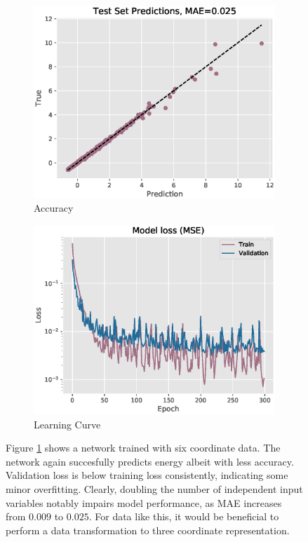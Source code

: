 \documentclass[12pt,a4paper]{article}
\begin{document}
\begin{figure}[h!]
\centering
    \begin{subfigure}[t]{0.49\textwidth}
        \includegraphics[width = \linewidth]{images/prediction2.eps}
        \caption{Accuracy}
        \label{fig:6acc}
    \end{subfigure}
    \begin{subfigure}[t]{0.49\textwidth}
        \includegraphics[width = \linewidth]{images/loss2.eps}
        \caption{Learning Curve}
        \label{fig:6loss}
    \end{subfigure}
\caption{Figure \ref{fig:6acc} shows a network trained with six coordinate data. The network again succesfully predicts energy albeit with less accuracy. Validation loss is below training loss consistently, indicating some minor overfitting. Clearly, doubling the number of independent input variables notably impairs model performance, as MAE increases from $0.009$ to $0.025$. For data like this, it would be beneficial to perform a data transformation to three coordinate representation.}
\label{fig:Net2}
\pagebreak[4]
\end{figure}
\end{document}
